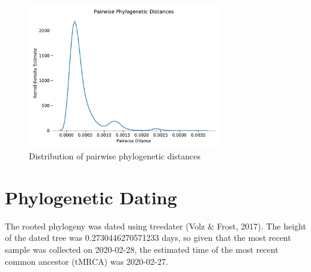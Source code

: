 \documentclass{article}
\begin{document}
\begin{figure}[h]
\centering
\includegraphics[width=0.75\textwidth]{./figs/pairwise_distances_tree.pdf}
\caption{Distribution of pairwise phylogenetic distances}
\end{figure}

\section{Phylogenetic Dating}
The rooted phylogeny was dated using treedater (Volz \& Frost, 2017).
The height of the dated tree was 0.2730446270571233 days,
so given that the most recent sample was collected on 2020-02-28,
the estimated time of the most recent common ancestor (tMRCA) was 2020-02-27.
\end{document}
